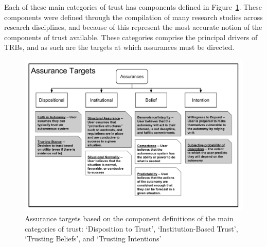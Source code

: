         Each of these main categories of trust has components defined in Figure~\ref{fig:Assurance_classes}. These components were defined through the compilation of many research studies across research disciplines, and because of this represent the most accurate notion of the components of trust available. These categories comprise the principal drivers of TRBs, and as such are the targets at which assurances must be directed.

        \begin{figure}[htbp]
            \includegraphics[width=\textwidth]{Figures/Assurances.pdf}%
            \caption{Assurance targets based on the component definitions of the main categories of trust: `Disposition to Trust', `Institution-Based Trust', `Trusting Beliefs', and `Trusting Intentions'}
            \label{fig:Assurance_classes}
        \end{figure}

